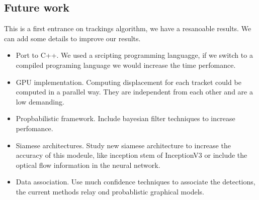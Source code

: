 \documentclass[12pt, a4paper, titlepage,twoside,openright]{article}
\begin{document}
\subsection{Future work}


This is a first entrance on trackings algorithm, we have a resanoable results. We can add some details to improve our results.


\begin{itemize}

\item Port to C++. We used a srcipting programming languagge, if we switch to a compiled programing language we would increase the time perfomance.

\item GPU implementation. Computing displacement for each tracket could be computed in a parallel way. They are independent from each other and are a low demanding. 

\item Propbabilistic framework. Include bayesian filter techniques to increase perfomance.

\item Siamese architectures. Study new siamese architecture to increase the accuracy of this modeule, like inception stem of InceptionV3 or include the optical flow information in the neural network.

\item Data association. Use much confidence techniques to associate the detections, the current methods relay ond probablistic graphical models.

\end{itemize}

{}

\end{document}
